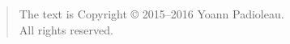 \begin{quote}
The text is Copyright \copyright{} 2015--2016 Yoann Padioleau.\\
All rights reserved.
\end{quote}

